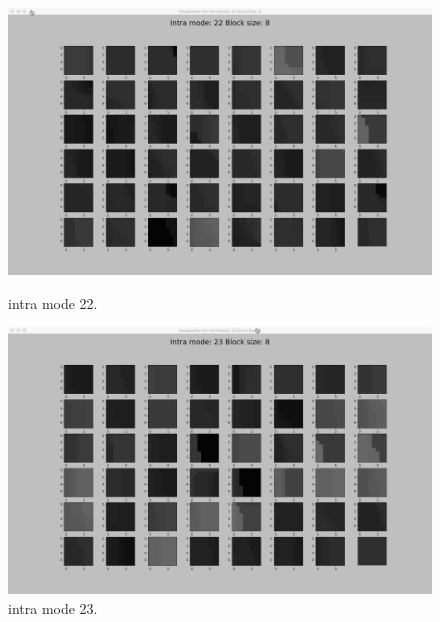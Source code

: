 \begin{figure}[H]

    \vspace*{1cm} %

    \begin{minipage}{0.49\textwidth}
        \includegraphics[width=\linewidth]{Figures/visu-size8x8/8-22}
        \caption[Intra mode 22]{intra mode 22.}
        \label{fig:size8_mode22}
    \end{minipage}
    \hspace{\fill} %
    \begin{minipage}{0.49\textwidth}
        \includegraphics[width=\linewidth]{Figures/visu-size8x8/8-23}
        \caption[Intra mode 23]{intra mode 23.}
        \label{fig:size8_mode23}
    \end{minipage}

    \vspace*{1cm} %


\end{figure}
